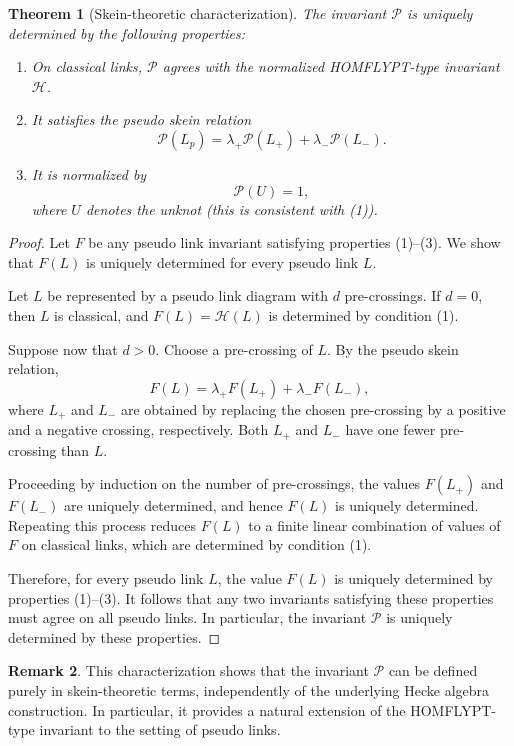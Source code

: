\documentclass[11pt]{article}
\numberwithin{equation}{section}
\newtheorem{theorem}{Theorem}[section]
\theoremstyle{definition}
\newtheorem{remark}[theorem]{Remark}
\begin{document}
\begin{theorem}[Skein-theoretic characterization]
The invariant \(\mathcal P\) is uniquely determined by the following properties:
\begin{enumerate}
    \item On classical links, \(\mathcal P\) agrees with the normalized
    HOMFLYPT-type invariant \(\mathcal H\).
    
    \item It satisfies the pseudo skein relation
    \[
    \mathcal P(L_p)
    =
    \lambda_+ \mathcal P(L_+)
    +
    \lambda_- \mathcal P(L_-).
    \]
    
    \item It is normalized by
    \[
    \mathcal P(U)=1,
    \]
    where \(U\) denotes the unknot (this is consistent with (1)).
\end{enumerate}
\end{theorem}

\begin{proof}
Let \(F\) be any pseudo link invariant satisfying properties (1)--(3). We show that \(F(L)\) is uniquely determined for every pseudo link \(L\).

Let \(L\) be represented by a pseudo link diagram with \(d\) pre-crossings. If \(d=0\), then \(L\) is classical, and \(F(L)=\mathcal H(L)\) is determined by condition (1).

Suppose now that \(d>0\). Choose a pre-crossing of \(L\). By the pseudo skein relation,
\[
F(L)
=
\lambda_+ F(L_+)
+
\lambda_- F(L_-),
\]
where \(L_+\) and \(L_-\) are obtained by replacing the chosen pre-crossing by a positive and a negative crossing, respectively. Both \(L_+\) and \(L_-\) have one fewer pre-crossing than \(L\).

Proceeding by induction on the number of pre-crossings, the values
\(F(L_+)\) and \(F(L_-)\) are uniquely determined, and hence \(F(L)\) is uniquely determined. Repeating this process reduces \(F(L)\) to a finite linear combination of values of \(F\) on classical links, which are determined by condition (1).

Therefore, for every pseudo link \(L\), the value \(F(L)\) is uniquely determined by properties (1)--(3). It follows that any two invariants satisfying these properties must agree on all pseudo links. In particular, the invariant \(\mathcal P\) is uniquely determined by these properties.
\end{proof}

\begin{remark}
This characterization shows that the invariant \(\mathcal P\) can be defined purely in skein-theoretic terms, independently of the underlying Hecke algebra construction. In particular, it provides a natural extension of the HOMFLYPT-type invariant \cite{HOMFLY1985} to the setting of pseudo links.
\end{remark}
\end{document}
